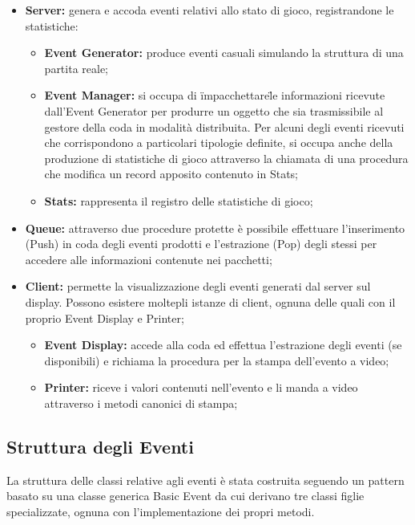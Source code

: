 \documentclass[aps,letterpaper,10pt]{article}
\begin{document}
\begin{itemize}
	\item \textbf{Server:} genera e accoda eventi relativi allo stato di gioco, registrandone le statistiche:
		\begin{itemize}
			\item \textbf{Event Generator:} produce eventi casuali simulando la struttura di una partita reale;
\item \textbf{Event Manager:} si occupa di \"impacchettare\" le informazioni ricevute dall'Event Generator per produrre
un oggetto che sia trasmissibile al gestore della coda in modalit\`a distribuita. Per alcuni degli eventi ricevuti che
corrispondono a particolari tipologie definite, si occupa anche della produzione di statistiche di gioco attraverso la
chiamata di una procedura che modifica un record apposito contenuto in Stats;
			\item \textbf{Stats:} rappresenta il registro delle statistiche di gioco;
		\end{itemize}
\item \textbf{Queue:} attraverso due procedure protette \`e possibile effettuare l'inserimento (Push) in coda degli
eventi prodotti e l'estrazione (Pop) degli stessi per accedere alle informazioni contenute nei pacchetti;
\item \textbf{Client:} permette la visualizzazione degli eventi generati dal server sul display. Possono esistere
moltepli istanze di client, ognuna delle quali con il proprio Event Display e Printer;
		\begin{itemize}
\item \textbf{Event Display:} accede alla coda ed effettua l'estrazione degli eventi (se disponibili) e richiama la
procedura per la stampa dell'evento a video;
\item \textbf{Printer:} riceve i valori contenuti nell'evento e li manda a video attraverso i metodi canonici di stampa;		\end{itemize}
\end{itemize}

\subsection{Struttura degli Eventi}

La struttura delle classi relative agli eventi \`e stata costruita seguendo un pattern basato su una classe generica
Basic Event da cui derivano tre classi figlie specializzate, ognuna con l'implementazione dei propri metodi.
\end{document}
